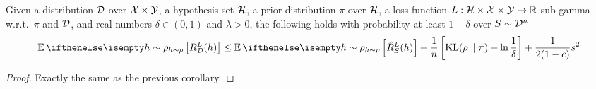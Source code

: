 \begin{corollary}
  \label{cor:alquier-sub-gamma}
  Given a distribution $\mathcal{D}$ over $\mathcal{X} \times \mathcal{Y}$, a hypothesis set $\mathcal{H}$, a
  prior distribution $\pi$ over $\mathcal{H}$, a loss function $L : \mathcal{H} \times \mathcal{X} \times
  \mathcal{Y} \to \mathbb{R}$ sub-gamma w.r.t.\ $\pi$ and $\mathcal{D}$, and real numbers $\delta \in
  (0, 1)$ and $\lambda > 0$, the following holds with probability at least $1 -
  \delta$ over $S \sim \mathcal{D}^n$
  \begin{equation}
    \label{eq:alquier-bound-sub-gamma-loss}
    \Ev[h \sim \rho]{R_\CD^L(h)} \leq \Ev[h \sim \rho]{\hat{R}_S^L(h)} +
    \frac{1}{n}\left[\KL{\rho}{\pi} + \ln \frac{1}{\delta}\right] +
    \frac{1}{2 (1 - c)} s^2
  \end{equation}
\end{corollary}

\begin{proof}
  Exactly the same as the previous corollary.
\end{proof}
